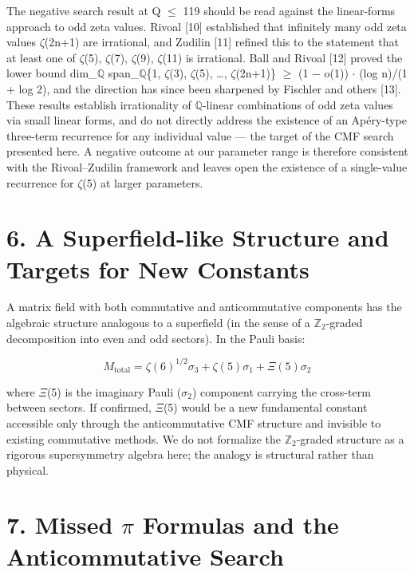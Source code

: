 \documentclass[11pt]{article}
\begin{document}
The negative search result at Q \(\leq\) 119 should be read against the
linear-forms approach to odd zeta values. Rivoal {[}10{]} established
that infinitely many odd zeta values \(\zeta\)(2n+1) are irrational, and
Zudilin {[}11{]} refined this to the statement that at least one of
\(\zeta\)(5), \(\zeta\)(7), \(\zeta\)(9), \(\zeta\)(11) is irrational.
Ball and Rivoal {[}12{]} proved the lower bound dim\_\(\mathbb{Q}\)
span\_\(\mathbb{Q}\)\{1, \(\zeta\)(3), \(\zeta\)(5), \ldots,
\(\zeta\)(2n+1)\} \(\geq\) (1 − o(1)) \(\cdot\) (log n)/(1 + log 2), and
the direction has since been sharpened by Fischler and others {[}13{]}.
These results establish irrationality of \(\mathbb{Q}\)-linear
combinations of odd zeta values via small linear forms, and do not
directly address the existence of an Apéry-type three-term recurrence
for any individual value --- the target of the CMF search presented
here. A negative outcome at our parameter range is therefore consistent
with the Rivoal--Zudilin framework and leaves open the existence of a
single-value recurrence for \(\zeta\)(5) at larger parameters.

\hypertarget{a-superfield-like-structure-and-targets-for-new-constants}{%
\section{6. A Superfield-like Structure and Targets for New
Constants}\label{a-superfield-like-structure-and-targets-for-new-constants}}

A matrix field with both commutative and anticommutative components has
the algebraic structure analogous to a superfield (in the sense of a
\(\mathbb{Z}_{2}\)-graded decomposition into even and odd sectors). In
the Pauli basis:

\[M_{\text{total}} = \zeta(6)^{1/2}\sigma_3 + \zeta(5)\sigma_1 + \Xi(5)\sigma_2\]

where \(\Xi\)(5) is the imaginary Pauli (\(\sigma_{2}\)) component
carrying the cross-term between sectors. If confirmed, \(\Xi\)(5) would
be a new fundamental constant accessible only through the
anticommutative CMF structure and invisible to existing commutative
methods. We do not formalize the \(\mathbb{Z}_{2}\)-graded structure as
a rigorous supersymmetry algebra here; the analogy is structural rather
than physical.

\hypertarget{missed-formulas-and-the-anticommutative-search}{%
\section{\texorpdfstring{7. Missed \(\pi\) Formulas and the
Anticommutative
Search}{7. Missed  Formulas and the Anticommutative Search}}\label{missed-formulas-and-the-anticommutative-search}}
\end{document}
